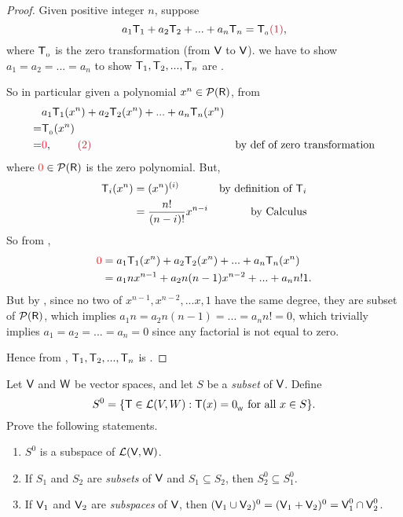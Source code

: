 \begin{proof}
Given positive integer \(n\), suppose
\[
    a_1\T_1 + a_2\T_2 + ... + a_n\T_n = \TZERO \MAROON{(1)},
\]
where \(\textsf{T}_{_0}\) is the zero transformation (from \(\textsf{V}\) to \(\textsf{V}\)).
we have to show \(a_1 = a_2 = ... = a_n\) to show \(\textsf{T}_1, \textsf{T}_2, ..., \textsf{T}_n\) are \LID{}.

So in particular given a polynomial \(x^n \in \mathcal{P}(\textsf{R})\), from 
\begin{align*}
      & a_1 \T_1(x^n) + a_2 \T_2(x^n) + ... + a_n \T_n(x^n) \\
    = & \TZERO(x^n) \\
    = & \RED{0}, \MAROON{\ \ \ \ \ \ \ (2)} & \text{by def of zero transformation}
\end{align*}
where \(\RED{0} \in \mathcal{P}(\SET{R})\) is the zero polynomial.
But,
\begin{align*}
    \textsf{T}_i(x^n) & = (x^n)^{(i)} & \text{by definition of \(\textsf{T}_i\)} \\
              & = \frac{n!}{(n-i)!}x^{n - i} & \text{by Calculus}
\end{align*}
So from ,
\begin{align*}
    \RED{0} & = a_1 \T_1(x^n) + a_2 \T_2(x^n) + ... + a_n \T_n(x^n) \\
            & = a_1 n x^{n - 1} + a_2 n(n-1) x^{n - 2} + ... + a_n n! 1.
\end{align*}
But by , since no two of \(x^{n - 1}, x^{n - 2}, ... x, 1\) have the same degree, they are \LID{} subset of \(\mathcal{P}(\textsf{R})\),
which implies \(a_1 n = a_2 n(n - 1) = ... = a_n n! = 0\),
which trivially implies \(a_1 = a_2 = ... = a_n = 0\) since any factorial is not equal to zero.

Hence from , \(\textsf{T}_1, \textsf{T}_2, ..., \textsf{T}_n\) is \LID{}.
\end{proof}

\begin{exercise} \label{exercise 2.2.16}
Let \(\textsf{V}\) and \(\textsf{W}\) be vector spaces, and let \(S\) be a \emph{subset} of \(\textsf{V}\).
Define
\[
    S^0 = \{ \textsf{T} \in \mathcal{L}(V, W) : \textsf{T}(x) = 0_{_{\textsf{W}}} \text{ for all } x \in S \}.
\]
Prove the following statements.
\begin{enumerate}
\item \(S^0\) is a subspace of \(\mathcal{L}(\textsf{V}, \textsf{W})\).
\item If \(S_1\) and \(S_2\) are \emph{subsets} of \(\textsf{V}\) and \(S_1 \subseteq S_2\), then \(S_2^0 \subseteq S_1^0\).
\item If \(\textsf{V}_1\) and \(\textsf{V}_2\) are \emph{subspaces} of \(\textsf{V}\), then \((\textsf{V}_1 \cup \textsf{V}_2)^0 = (\textsf{V}_1 + \textsf{V}_2)^0 = \textsf{V}_1^0 \cap \textsf{V}_2^0\).
\end{enumerate}
\end{exercise}

